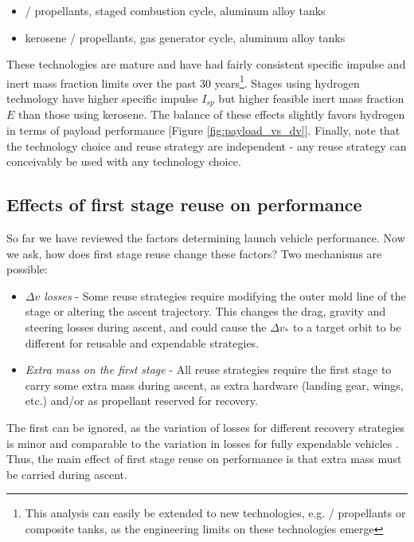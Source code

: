 \documentclass{iaf-iac}
\begin{document}
\begin{multicols}{2}
\begin{itemize}
    \item {} /  propellants, staged combustion cycle, aluminum alloy tanks
    \item kerosene /  propellants, gas generator cycle, aluminum alloy tanks
\end{itemize}


These technologies are mature and have had fairly consistent specific impulse and inert mass fraction limits over the past 30 years\footnote{This analysis can easily be extended to new technologies, e.g.  /  propellants or composite tanks, as the engineering limits on these technologies emerge}. Stages using hydrogen technology have higher specific impulse $I_{sp}$ but higher feasible inert mass fraction $E$ than those using kerosene. The balance of these effects slightly favors hydrogen in terms of payload performance [Figure \ref{fig:payload_vs_dv}]. Finally, note that the technology choice and reuse strategy are independent - any reuse strategy can conceivably be used with any technology choice.

\subsection{Effects of first stage reuse on performance} \label{sec:effects_of_first_stage_reuse_on_performance}
So far we have reviewed the factors determining launch vehicle performance. Now we ask, how does first stage reuse change these factors? Two mechanisms are possible:

\begin{itemize}
    \item \emph{$\Delta v$ losses} - Some reuse strategies require modifying the outer mold line of the stage or altering the ascent trajectory. This changes the drag, gravity and steering losses during ascent, and could cause the $\Delta v_*$ to a target orbit to be different for reusable and expendable strategies.
    \item \emph{Extra mass on the first stage} - All reuse strategies require the first stage to carry some extra mass during ascent, as extra hardware (landing gear, wings, etc.) and/or as propellant reserved for recovery.
\end{itemize}

The first can be ignored, as the variation of losses for different recovery strategies is minor and comparable to the variation in losses for fully expendable vehicles \cite{Stappert2017}. Thus, the main effect of first stage reuse on performance is that extra mass must be carried during ascent.


\end{multicols}
\end{document}
